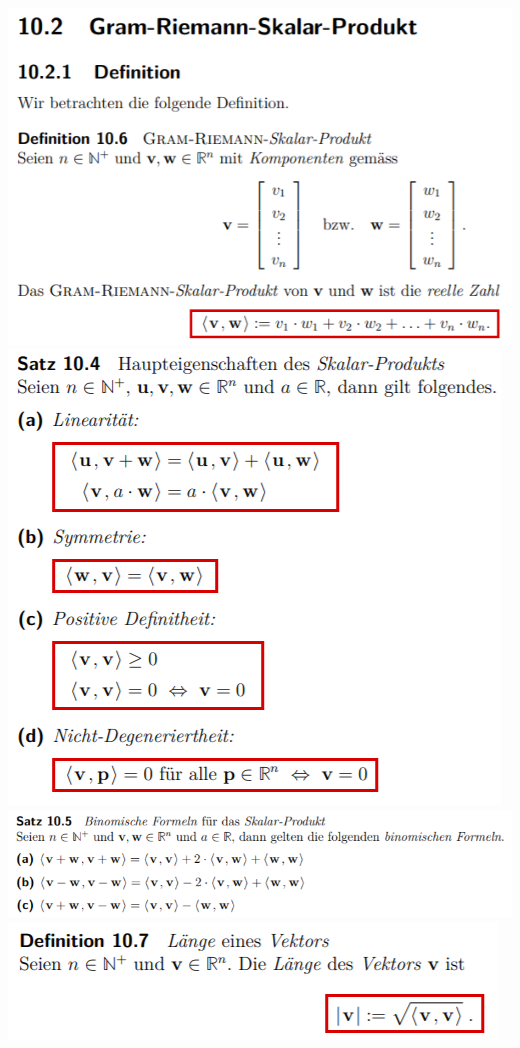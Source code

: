 \includegraphics[width=\columnwidth]{./images/vek9.png}
\includegraphics[width=\columnwidth]{./images/vek10.png}
\includegraphics[width=\columnwidth]{./images/vek11.png}
\includegraphics[width=\columnwidth]{./images/vek12.png}
